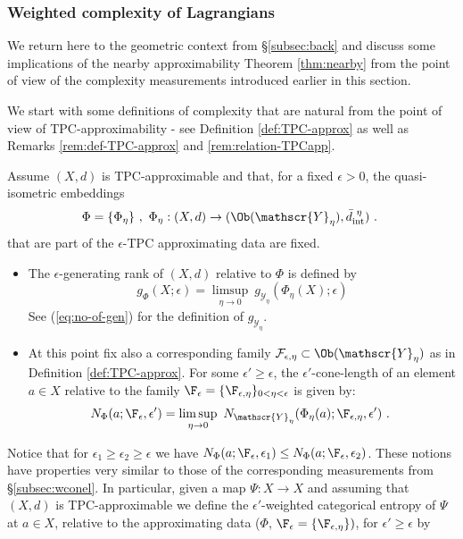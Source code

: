 \subsubsection{Weighted complexity of Lagrangians} \label{subsubsec:complex_Lag}
We return here to the geometric context from \S\ref{subsec:back} and discuss some implications of the nearby approximability Theorem \ref{thm:nearby} from the point of view of the complexity measurements
introduced earlier in this section. 

We start with some definitions of complexity that are natural from the point of view of TPC-approximability - 
see Definition \ref{def:TPC-approx} as well as Remarks \ref{rem:def-TPC-approx} and \ref{rem:relation-TPCapp}. 

\begin{dfn} Assume $(X,d)$ is TPC-approximable and that, for a fixed $\epsilon >0$, the quasi-isometric embeddings $$\Phi = \{\Phi_{\eta}\} \ , \ \Phi_{\eta}: (X,d)\to (\Ob (\mathscr{Y}_{\eta}), \bar{d}_{\mathrm{int}}^{\ \eta})~.~$$
 that are part of the $\epsilon$-TPC approximating data are fixed. 
 \begin{itemize}
\item[i.] The $\epsilon$-generating rank of $(X,d)$ relative to $\Phi$ is defined by 
$$g_{\Phi}(X;\epsilon)= \limsup_{\eta\to 0}\   g_{\mathscr{Y}_{\eta}}(\Phi_{\eta}(X);\epsilon)  $$ See  (\ref{eq:no-of-gen}) for the definition of $g_{\mathscr{Y}_{\eta}}$.
\item[ii.] At this point  fix also a corresponding family $\mathcal{F}_{\epsilon,\eta}\subset \Ob (\mathscr{Y}_{\eta})$ as in Definition \ref{def:TPC-approx}.  For some $\epsilon'\geq \epsilon$, the $\epsilon'$-cone-length of an element $a\in X$ relative to the family $\F_{\epsilon}= \{\F_{\epsilon,\eta}\}_{0< \eta<\epsilon }$  is given by:
$$N_{\Phi}(a; \F_{\epsilon},\epsilon')= \limsup_{\eta\to 0} \  N_{\mathscr{Y}_{\eta}}(\Phi_{\eta}(a); \F_{\epsilon,\eta}, \epsilon') ~.~$$
\end{itemize}
\end{dfn}

Notice that for $\epsilon_{1}\geq \epsilon_{2}\geq \epsilon$ we have $ N_{\Phi}(a; \F_{\epsilon},\epsilon_{1})\leq N_{\Phi}(a; \F_{\epsilon},\epsilon_{2})$.
These notions have properties very similar to those of the corresponding measurements from \S\ref{subsec:wconel}. In particular, given a map $\Psi : X\to X$ and assuming that $(X,d)$ is TPC-approximable we define the $\epsilon'$-weighted categorical entropy of $\Psi$ at $a\in X$, relative
to the approximating data ($\Phi$, $\F_{\epsilon}=\{\F_{\epsilon,\eta}\})$, for $\epsilon'\geq \epsilon$ by

